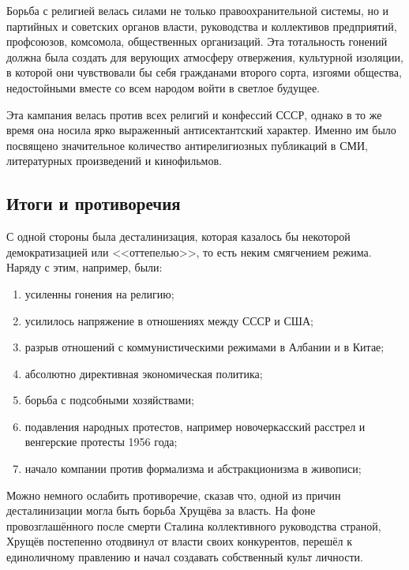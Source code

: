 \documentclass[12pt]{article}
\begin{document}
  Борьба с религией велась силами не только правоохранительной системы, но и партийных и советских органов власти,
  руководства и коллективов предприятий, профсоюзов, комсомола, общественных организаций.
  Эта тотальность гонений должна была создать для верующих атмосферу отвержения, культурной изоляции,
  в которой они чувствовали бы себя гражданами второго сорта, изгоями общества,
  недостойными вместе со всем народом войти в светлое будущее.

  Эта кампания велась против всех религий и конфессий СССР, однако в то же время она носила ярко выраженный антисектантский характер.
  Именно им было посвящено значительное количество антирелигиозных публикаций в СМИ, литературных произведений и кинофильмов.

  \subsection{Итоги и противоречия}
  С одной стороны была десталинизация, которая казалось бы некоторой демократизацией или <<оттепелью>>, то есть неким смягчением режима.
  Наряду с этим, например, были:
  \begin{enumerate}
    \item усиленны гонения на религию;
    \item усилилось напряжение в отношениях между СССР и США;
    \item разрыв отношений с коммунистическими режимами в Албании и в Китае;
    \item абсолютно директивная экономическая политика;
    \item борьба с подсобными хозяйствами;
    \item подавления народных протестов, например новочеркасский расстрел и венгерские протесты 1956 года;
    \item начало компании против формализма и абстракционизма в живописи;
  \end{enumerate}

  Можно немного ослабить противоречие, сказав что, одной из причин десталинизации могла быть борьба Хрущёва за власть.
  На фоне провозглашённого после смерти Сталина коллективного руководства страной,
  Хрущёв постепенно отодвинул от власти своих конкурентов,
  перешёл к единоличному правлению и начал создавать собственный культ личности.
\end{document}

